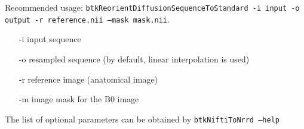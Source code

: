 \begin{description}
Recommended usage: \texttt{btkReorientDiffusionSequenceToStandard -i input
-o output -r reference.nii --mask mask.nii}.
\begin{itemize}
\item[-i] input sequence
\item[-o] resampled sequence (by default, linear interpolation is used)
\item[-r] reference image (anatomical image)
\item[-m] image mask for the B0 image
\end{itemize}

The list of optional parameters can be obtained by \texttt{btkNiftiToNrrd
--help}

\end{description}
